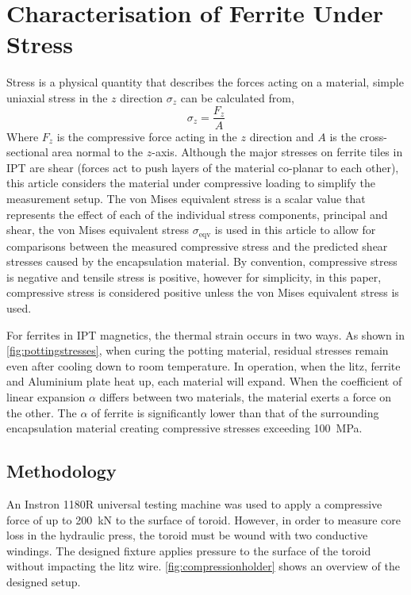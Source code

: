 \documentclass[conference]{IEEEtran}
\begin{document}
\section{Characterisation of Ferrite Under Stress}
Stress is a physical quantity that describes the forces acting on a material, simple uniaxial stress in the $z$ direction $\sigma_z$ can be calculated from, 
\begin{equation}
  \sigma_z = \frac{F_z}{A}
  \label{eqn:uniaxialstress}
\end{equation}
Where $F_z$ is the compressive force acting in the $z$ direction and $A$ is the cross-sectional area normal to the $z$-axis. 
Although the major stresses on ferrite tiles in IPT are shear (forces act to push layers of the material co-planar to each other), this article considers the material under compressive loading to simplify the measurement setup. 
The von Mises equivalent stress is a scalar value that represents the effect of each of the individual stress components, principal and shear, the von Mises equivalent stress $\sigma_\text{eqv}$ is used in this article to allow for comparisons between the measured compressive stress and the predicted shear stresses caused by the encapsulation material. 
By convention, compressive stress is negative and tensile stress is positive, however for simplicity, in this paper, compressive stress is considered positive unless the von Mises equivalent stress is used. 

For ferrites in IPT magnetics, the thermal strain occurs in two ways.
As shown in \cref{fig:pottingstresses}, when curing the potting material, residual stresses remain even after cooling down to room temperature. 
In operation, when the litz, ferrite and Aluminium plate heat up, each material will expand. 
When the coefficient of linear expansion $\alpha$ differs between two materials, the material exerts a force on the other. 
The $\alpha$ of ferrite is significantly lower than that of the surrounding encapsulation material creating compressive stresses exceeding \SI{100}{\mega\pascal}. 

\subsection{Methodology}

An Instron 1180R universal testing machine was used to apply a compressive force of up to \SI{200}{\kilo\newton} to the surface of toroid. 
However, in order to measure core loss in the hydraulic press, the toroid must be wound with two conductive windings. 
The designed fixture applies pressure to the surface of the toroid without impacting the litz wire.
\cref{fig:compressionholder} shows an overview of the designed setup. 
\end{document}
